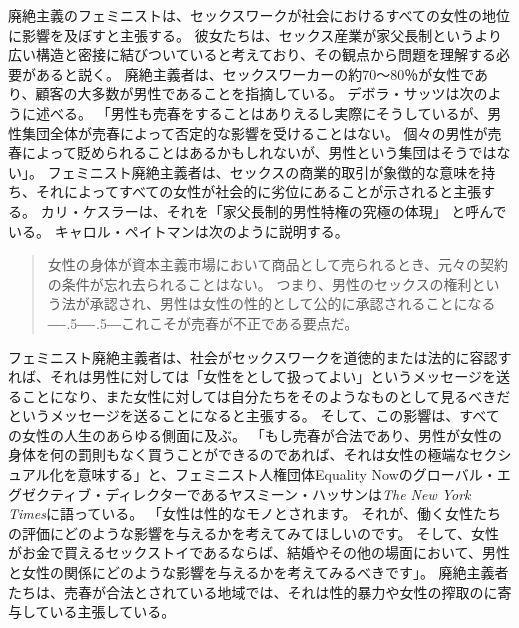 \documentclass[paper=a4,book,openany]{jlreq}
\def\DDASH{―\kern-.5\zw―\kern-.5\zw―} %
\begin{document}
廃絶主義のフェミニストは、セックスワークが社会におけるすべての女性の地位に影響を及ぼすと主張する。
彼女たちは、セックス産業が家父長制というより広い構造と密接に結びついていると考えており、その観点から問題を理解する必要があると説く。
廃絶主義者は、セックスワーカーの約70～80％が女性であり、顧客の大多数が男性であることを指摘している。
デボラ・サッツは次のように述べる。
「男性も売春をすることはありえるし実際にそうしているが、男性集団全体が売春によって否定的な影響を受けることはない。
個々の男性が売春によって貶められることはあるかもしれないが、男性という集団はそうではない」\citep[p.149]{satz95:_market_women_sexual_labor}。
フェミニスト廃絶主義者は、セックスの商業的取引が象徴的な意味を持ち、それによってすべての女性が社会的に劣位にあることが示されると主張する。
カリ・ケスラーは、それを「家父長制的男性特権の究極の体現」 と呼んでいる\citep[p.19]{kesler02:_is_femin_stanc_suppor_prost_possib}。
キャロル・ペイトマンは次のように説明する。

\begin{quote}
女性の身体が資本主義市場において商品として売られるとき、元々の契約の条件が忘れ去られることはない。
つまり、男性のセックスの権利という法が承認され、男性は女性の性的として公的に承認されることになる{\DDASH}これこそが売春が不正である要点だ。
\citep[p.208]{pateman88:_sexual_contr}
\end{quote}

フェミニスト廃絶主義者は、社会がセックスワークを道徳的または法的に容認すれば、それは男性に対しては「女性をとして扱ってよい」というメッセージを送ることになり、また女性に対しては自分たちをそのようなものとして見るべきだというメッセージを送ることになると主張する。
そして、この影響は、すべての女性の人生のあらゆる側面に及ぶ。
「もし売春が合法であり、男性が女性の身体を何の罰則もなく買うことができるのであれば、それは女性の極端なセクシュアル化を意味する」と、フェミニスト人権団体Equality Nowのグローバル・エグゼクティブ・ディレクターであるヤスミーン・ハッサンは\emph{The New York Times}に語っている。
「女性は性的なモノとされます。
それが、働く女性たちの評価にどのような影響を与えるかを考えてみてほしいのです。
そして、女性がお金で買えるセックストイであるならば、結婚やその他の場面において、男性と女性の関係にどのような影響を与えるかを考えてみるべきです」\citep{bazelon16:_shoul_prost_be_crime}。
廃絶主義者たちは、売春が合法とされている地域では、それは性的暴力や女性の搾取のに寄与している主張している\citep[p.3]{waltman10:_prohib_purch_sex_sweden}。
\end{document}
